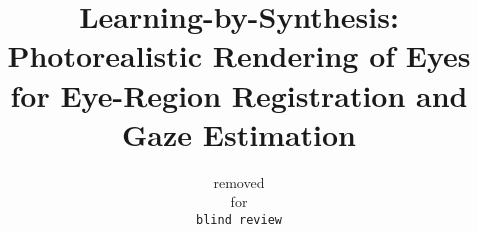 \documentclass[10pt,twocolumn,letterpaper]{article}
\begin{document}
\title{Learning-by-Synthesis: Photorealistic Rendering of Eyes for Eye-Region Registration and Gaze Estimation}


\author{removed\\
for\\
{\tt\small blind review}
}

\maketitle

\begin{abstract}

\end{abstract}









{\small


}
\end{document}
